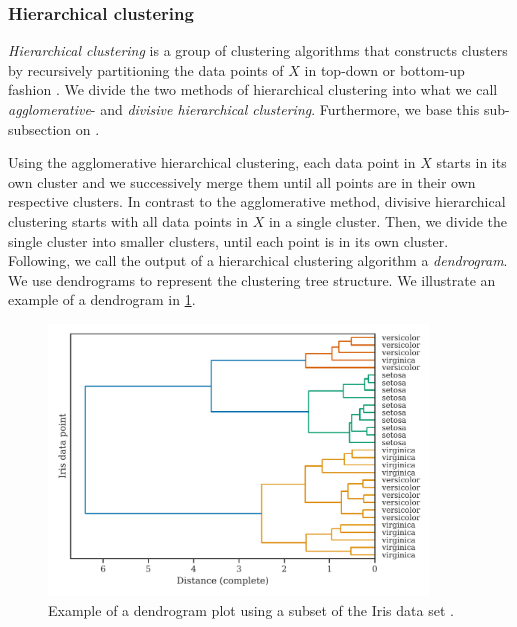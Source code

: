 \subsubsection{Hierarchical clustering}
\label{sec:hierarchical-clustering}
\textit{Hierarchical clustering} is a group of clustering algorithms that constructs clusters by recursively partitioning the data points of $X$ in top-down or bottom-up fashion \cite{Rokach2005}. We divide the two methods of hierarchical clustering into what we call \textit{agglomerative}- and \textit{divisive hierarchical clustering}. Furthermore, we base this sub-subsection on \cite{Rokach2005}.

Using the agglomerative hierarchical clustering, each data point in $X$ starts in its own cluster and we successively merge them until all points are in their own respective clusters. In contrast to the agglomerative method, divisive hierarchical clustering starts with all data points in $X$ in a single cluster. Then, we divide the single cluster into smaller clusters, until each point is in its own cluster. Following, we call the output of a hierarchical clustering algorithm a \textit{dendrogram}. We use dendrograms to represent the clustering tree structure. We illustrate an example of a dendrogram in \cref{fig:dendrogram-example}.
\begin{figure}[H]
    \centering
    \includegraphics[width=0.9\textwidth]{thesis/figures/dendrogram-example.pdf}
    \caption{Example of a dendrogram plot using a subset of the Iris data set \cite{Fisher1936}.}
    \label{fig:dendrogram-example}
\end{figure}

